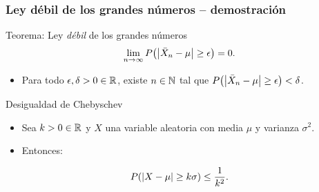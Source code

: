 \documentclass[table]{beamer}
\begin{document}
\begin{frame}
    \frametitle{Ley débil de los grandes números -- demostración}
    \begin{block}{Teorema: Ley \emph{débil} de los grandes números}
        \begin{equation*}
            \lim_{n \rightarrow \infty} \prob{\vparens{\bar{X}_{n} - \mu} \geq \epsilon} = 0 .
        \end{equation*}
        \begin{itemize}
            \item Para todo $\epsilon, \delta > 0 \in \mathbb{R}$, existe $n \in \mathbb{N}$ tal que $\prob{\vparens{\bar{X}_{n} - \mu} \geq \epsilon} < \delta$.
        \end{itemize}
    \end{block}
    \begin{block}{Desigualdad de Chebyschev}
        \begin{itemize}
            \item Sea $k > 0 \in \mathbb{R}$ y $X$ una variable aleatoria con media $\mu$ y varianza $\sigma^{2}$.
            \item Entonces:
        \end{itemize}
        \begin{equation*}
            \prob{\vparens{X - \mu} \geq k \sigma} \leq \frac{1}{k^{2}} .
        \end{equation*}
    \end{block}
\end{frame}
\end{document}
